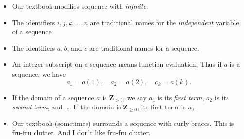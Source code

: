 \documentclass[portrait,fleqn,12pt]{beamer}
\newcommand{\reals}{\mathbf{R}}
\newcommand{\integers}{\mathbf{Z}}
\begin{document}
\begin{frame}

\begin{itemize}

\item Our textbook modifies sequence with \emph{infinite}.

\item The identifiers \(i,j,k, \dots, n\) are   traditional names for the \emph{independent} variable of a sequence.

\item The identifiers \(a,b\), and \(c\) are traditional names for a
sequence.


\item An integer subscript on a sequence means function evaluation.
Thus if \(a\) is a sequence, we have
\[
   a_1 = a(1), \quad a_2= a(2),  \quad a_k = a(k).
\]

\item If the domain of a sequence \(a\) is \(\integers_{>0}\), we say
\(a_1\) is its {\em first term}, \(a_2\) is its {\em second term}, and \dots.
If the domain is  \(\integers_{\geq 0}\), its first term is \(a_0\).

\item Our textbook (sometimes) surrounds a sequence with curly braces.
This is fru-fru clutter. And I don't like fru-fru clutter.




\end{itemize}

\end{frame}
\end{document}
